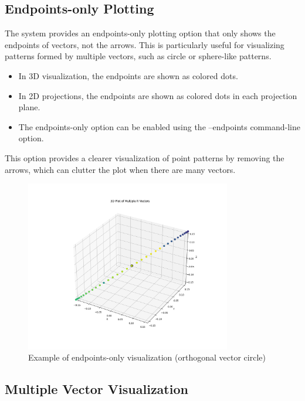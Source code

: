\subsection{Endpoints-only Plotting}

The system provides an endpoints-only plotting option that only shows the endpoints of vectors, not the arrows. This is particularly useful for visualizing patterns formed by multiple vectors, such as circle or sphere-like patterns.

\begin{itemize}
    \item In 3D visualization, the endpoints are shown as colored dots.
    \item In 2D projections, the endpoints are shown as colored dots in each projection plane.
    \item The endpoints-only option can be enabled using the --endpoints command-line option.
\end{itemize}

This option provides a clearer visualization of point patterns by removing the arrows, which can clutter the plot when there are many vectors.

\begin{figure}[H]
    \centering
    \includegraphics[width=0.8\textwidth]{figures/circle_3d.png}
    \caption{Example of endpoints-only visualization (orthogonal vector circle)}
    \label{fig:vis_endpoints_only}
\end{figure}

\subsection{Multiple Vector Visualization}

